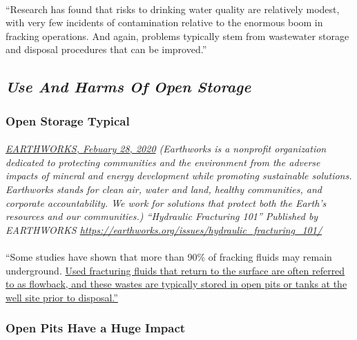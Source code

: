 \documentclass{article}
\begin{document}
\normalsize
\paragraph{}
``Research has found that risks to drinking water quality are relatively modest, with very few incidents of contamination relative to the enormous boom in fracking operations. And again, problems typically stem from wastewater storage and disposal procedures that can be improved.”

\subsection{\emph{Use And Harms Of Open Storage}}

\subsubsection{Open Storage Typical}
\paragraph{}
\small
\textit{
\underline{EARTHWORKS, Febuary 28, 2020}
(Earthworks is a nonprofit organization dedicated to protecting communities and the environment from the adverse impacts of mineral and energy development while promoting sustainable solutions. Earthworks stands for clean air, water and land, healthy communities, and corporate accountability. We work for solutions that protect both the Earth’s resources and our communities.) “Hydraulic Fracturing 101” Published by EARTHWORKS 
\url{https://earthworks.org/issues/hydraulic_fracturing_101/}}
\normalsize

\paragraph{}
``Some studies have shown that more than 90\% of fracking fluids may remain underground. \ul{Used fracturing fluids that return to the surface are often referred to as flowback, and these wastes are typically stored in open pits or tanks at the well site prior to disposal.''}

\subsubsection{Open Pits Have a Huge Impact}
\end{document}
